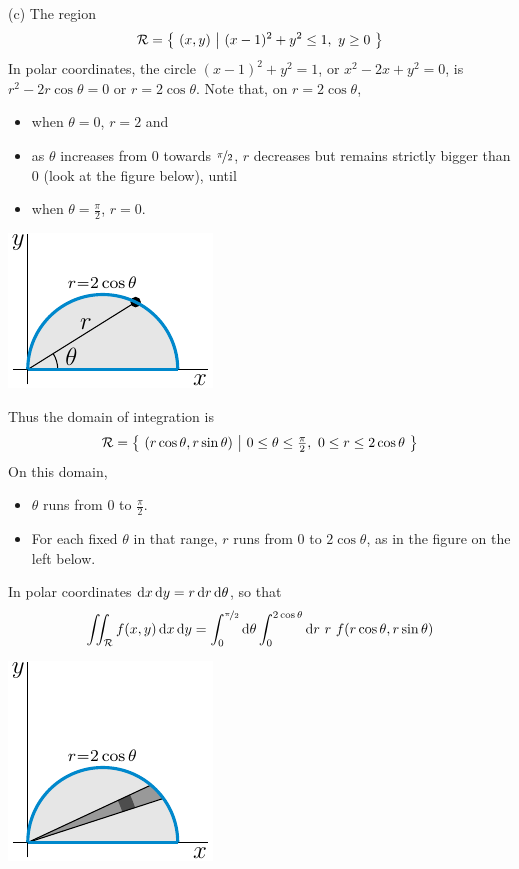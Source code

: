 \begin{solution}
(c) The region 
\begin{equation*}
\mathcal{R}=\big\{ \ (x,y)\ \big|\ (x-1)^2+y^2\le 1,\ y \ge 0\ \big\}
\end{equation*}
In polar coordinates, the circle $(x-1)^2+y^2= 1$, or $x^2-2x+y^2=0$,
is $r^2-2r\cos\theta=0$ or $r=2\cos\theta$. Note that, on $r=2\cos\theta$,
\begin{itemize}
\item
when $\theta=0$, $r=2$ and
\item
as $\theta$ increases from $0$ towards $\nicefrac{\pi}{2}$, $r$ decreases but remains strictly bigger than $0$ (look at the figure below), until
\item
when $\theta=\frac{\pi}{2}$, $r=0$.
\end{itemize}
\begin{center}
     \includegraphics{fig/polar5e4.pdf}
\end{center}
Thus the domain of integration is
\begin{equation*}
\cR=\Set{(r\cos\theta,r\sin\theta)}{0\le\theta\le\tfrac{\pi}{2},\ 
          0\le r\le 2\cos\theta}
\end{equation*}
On this domain,
\begin{itemize}
\item 
$\theta$ runs from $0$ to $\frac{\pi}{2}$. 
\item
For each fixed $\theta$ in that range, $r$ runs from $0$ to $2\cos\theta$, 
as in the figure on the left below.
\end{itemize}
In polar coordinates $\mathrm{d}x\,\mathrm{d}y = r\,\mathrm{d}r\,\mathrm{d}\theta$, so that
\begin{equation*}
\iint_{\mathcal{R}} f(x,y)\,\mathrm{d}x\,\mathrm{d}y
=\int_0^{\nicefrac{\pi}{2}}\mathrm{d}\theta
 \int_0^{2\cos\theta}\mathrm{d}r\ r\ f(r\cos\theta,r\sin\theta)
\end{equation*}
\begin{center}
     \includegraphics{fig/polar5e2.pdf}\qquad\qquad

\end{center}
\end{solution}
